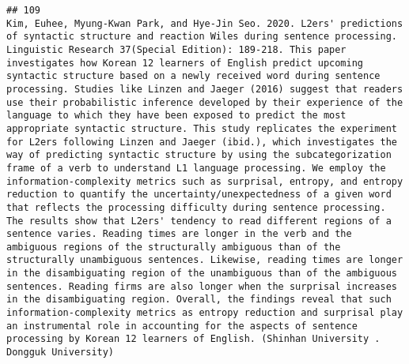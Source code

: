 \documentclass[
  english,
  man]{apa6}
\begin{document}
\begin{verbatim}
## 109                                                                                                                                                                                                                                                                                                                                                                                                                                                                                                                                                                                                                                                                                                                                                                                                                                                                                         Kim, Euhee, Myung-Kwan Park, and Hye-Jin Seo. 2020. L2ers' predictions of syntactic structure and reaction Wiles during sentence processing. Linguistic Research 37(Special Edition): 189-218. This paper investigates how Korean 12 learners of English predict upcoming syntactic structure based on a newly received word during sentence processing. Studies like Linzen and Jaeger (2016) suggest that readers use their probabilistic inference developed by their experience of the language to which they have been exposed to predict the most appropriate syntactic structure. This study replicates the experiment for L2ers following Linzen and Jaeger (ibid.), which investigates the way of predicting syntactic structure by using the subcategorization frame of a verb to understand L1 language processing. We employ the information-complexity metrics such as surprisal, entropy, and entropy reduction to quantify the uncertainty/unexpectedness of a given word that reflects the processing difficulty during sentence processing. The results show that L2ers' tendency to read different regions of a sentence varies. Reading times are longer in the verb and the ambiguous regions of the structurally ambiguous than of the structurally unambiguous sentences. Likewise, reading times are longer in the disambiguating region of the unambiguous than of the ambiguous sentences. Reading firms are also longer when the surprisal increases in the disambiguating region. Overall, the findings reveal that such information-complexity metrics as entropy reduction and surprisal play an instrumental role in accounting for the aspects of sentence processing by Korean 12 learners of English. (Shinhan University . Dongguk University)

\end{verbatim}
\end{document}
